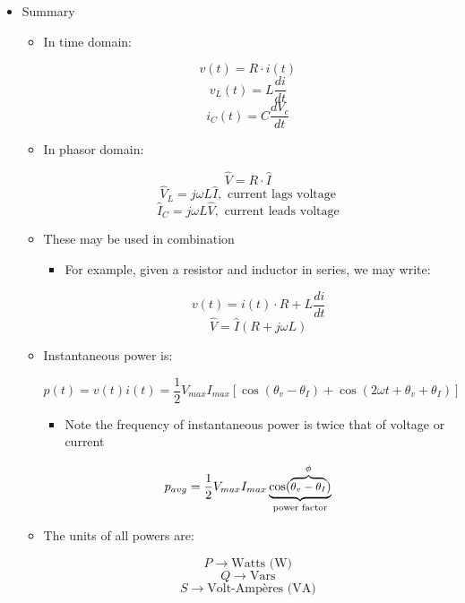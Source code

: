 \begin{itemize}
  \item Summary

    \begin{itemize}

      \item In time domain:

        $$v(t)=R\cdot i(t)$$
        $$v_L(t)=L\frac{di}{dt}$$
        $$i_C(t)=C\frac{dV_c}{dt}$$
        
      \item In phasor domain:

        $$\hat{V}=R\cdot\hat{I}$$
        $$\hat{V}_L=j\omega L\hat{I},\text{ current lags voltage}$$
        $$\hat{I}_C=j\omega L\hat{V},\text{ current leads voltage}$$

      \item These may be used in combination

        \begin{itemize}

          \item For example, given a resistor and inductor in series, we may write:

            $$v(t)=i(t)\cdot R+L\frac{di}{dt}$$
            $$\hat{V}=\hat{I}(R+j\omega L)$$

        \end{itemize}

      \item Instantaneous power is:

        $$p(t)=v(t)i(t)=\frac{1}{2}V_{max}I_{max}\left[ \cos(\theta_v-\theta_I) +\cos(2\omega t+\theta_v+\theta_I)\right]$$

        \begin{itemize}

          \item Note the frequency of instantaneous power is twice that of voltage or current

        \end{itemize}

      $$p_{avg}=\frac{1}{2}V_{max}I_{max}\underbrace{\cos\small(\overbrace{\theta_v-\theta_I}^{\phi}\small)}_{\text{power factor}}$$

    \item The units of all powers are:

      $$P\to \text{Watts (W)}$$
      $$Q\to \text{Vars}$$
      $$S\to \text{Volt-Amp\`eres (VA)}$$

    \end{itemize}

\end{itemize}




